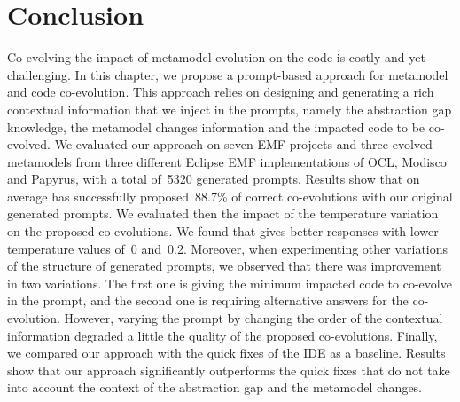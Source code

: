 \section{Conclusion}
\label{ch3_conclu}
Co-evolving the impact of metamodel evolution on the code is costly and yet challenging. In this chapter, we propose a prompt-based approach for metamodel and code co-evolution. This approach relies on designing and generating a rich contextual information that we inject in the prompts, namely the abstraction gap knowledge, the metamodel changes information and  the impacted code to be co-evolved.
We evaluated our approach on seven EMF projects and three evolved metamodels from three different Eclipse EMF implementations of OCL, Modisco and Papyrus, with a total of~5320 generated prompts. Results show that on average \LLM has successfully proposed~88.7\% of correct co-evolutions with our original generated prompts. We evaluated then the impact of the temperature variation on the proposed co-evolutions. We found that \LLM gives better responses with lower temperature values of~0 and~0.2. 
Moreover, when experimenting other variations of the structure of generated prompts, we observed that there was improvement in two variations. 
The first one is giving the minimum impacted code to co-evolve in the prompt, and the second one is requiring alternative answers for the co-evolution. However, varying the prompt by changing the order of the contextual information degraded a little the quality of the proposed co-evolutions. 
Finally, we compared our approach with the quick fixes of the IDE as a baseline. Results show that our approach significantly outperforms the quick fixes that do not take into account the context of the abstraction gap and the metamodel changes.



